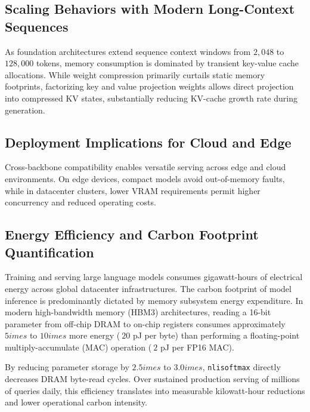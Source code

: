 \subsection{Scaling Behaviors with Modern Long-Context Sequences}
As foundation architectures extend sequence context windows from $2{,}048$ to $128{,}000$ tokens, memory consumption is dominated by transient key-value cache allocations. While weight compression primarily curtails static memory footprints, factorizing key and value projection weights allows direct projection into compressed KV states, substantially reducing KV-cache growth rate during generation.

\subsection{Deployment Implications for Cloud and Edge}
Cross-backbone compatibility enables versatile serving across edge and cloud environments. On edge devices, compact models avoid out-of-memory faults, while in datacenter clusters, lower VRAM requirements permit higher concurrency and reduced operating costs.

\subsection{Energy Efficiency and Carbon Footprint Quantification}
Training and serving large language models consumes gigawatt-hours of electrical energy across global datacenter infrastructures. The carbon footprint of model inference is predominantly dictated by memory subsystem energy expenditure. In modern high-bandwidth memory (HBM3) architectures, reading a 16-bit parameter from off-chip DRAM to on-chip registers consumes approximately $5	imes$ to $10	imes$ more energy ($~20$ pJ per byte) than performing a floating-point multiply-accumulate (MAC) operation ($~2$ pJ per FP16 MAC).

By reducing parameter storage by $2.5	imes$ to $3.0	imes$, \texttt{nlisoftmax} directly decreases DRAM byte-read cycles. Over sustained production serving of millions of queries daily, this efficiency translates into measurable kilowatt-hour reductions and lower operational carbon intensity.
